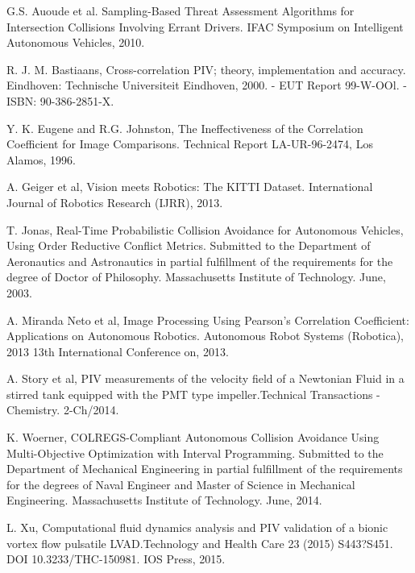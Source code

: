 \documentclass[letterpaper, 10 pt, conference]{ieeeconf}  %
\begin{document}
\begin{thebibliography}{99}

 G.S. Auoude et al. Sampling-Based Threat Assessment Algorithms for Intersection Collisions Involving 
        Errant Drivers. IFAC Symposium on Intelligent Autonomous Vehicles, 2010.
        
	 R. J. M. Bastiaans, Cross-correlation PIV; theory, implementation and accuracy. 
        Eindhoven: Technische Universiteit Eindhoven, 2000. - EUT Report 99-W-OOl. - ISBN: 90-386-2851-X.
        
         Y. K. Eugene and R.G. Johnston, The Ineffectiveness of the Correlation Coefficient for Image Comparisons.
        Technical Report LA-UR-96-2474, Los Alamos, 1996.
        
         A. Geiger et al,
        Vision meets Robotics: The KITTI Dataset. International Journal of Robotics Research (IJRR), 2013.
        
         T. Jonas, Real-Time Probabilistic Collision Avoidance for Autonomous Vehicles, Using Order Reductive 
        Conflict Metrics. Submitted to the Department of Aeronautics and Astronautics
	in partial fulfillment of the requirements for the degree of Doctor of Philosophy. Massachusetts Institute of Technology. June, 2003.
        
         A. Miranda Neto et al, Image Processing Using Pearson's Correlation Coefficient: 
        Applications on Autonomous Robotics. 
        Autonomous Robot Systems (Robotica), 2013 13th International Conference on, 2013.
	
	 A. Story et al, PIV measurements of the velocity field of a Newtonian Fluid in a stirred tank equipped 
	with the PMT type impeller.Technical Transactions - Chemistry. 2-Ch/2014.
	
	 K. Woerner, COLREGS-Compliant Autonomous Collision Avoidance Using Multi-Objective Optimization
	with Interval Programming. Submitted to the Department of Mechanical Engineering in partial fulfillment of the requirements for the 
	degrees of Naval Engineer and Master of Science in Mechanical Engineering. Massachusetts Institute of Technology. June, 2014.
	
	 L. Xu, Computational fluid dynamics analysis and PIV validation of a bionic vortex flow 
	pulsatile LVAD.Technology and Health Care 23 (2015) S443?S451. DOI 10.3233/THC-150981. IOS Press, 2015.


\end{thebibliography}
\end{document}
